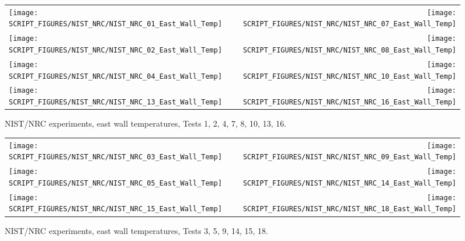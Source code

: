 \begin{figure}[p]
\begin{tabular*}{\textwidth}{l@{\extracolsep{\fill}}r}
\texttt{[image: SCRIPT\_FIGURES/NIST\_NRC/NIST\_NRC\_01\_East\_Wall\_Temp]} &
\texttt{[image: SCRIPT\_FIGURES/NIST\_NRC/NIST\_NRC\_07\_East\_Wall\_Temp]} \\
\texttt{[image: SCRIPT\_FIGURES/NIST\_NRC/NIST\_NRC\_02\_East\_Wall\_Temp]} &
\texttt{[image: SCRIPT\_FIGURES/NIST\_NRC/NIST\_NRC\_08\_East\_Wall\_Temp]} \\
\texttt{[image: SCRIPT\_FIGURES/NIST\_NRC/NIST\_NRC\_04\_East\_Wall\_Temp]} &
\texttt{[image: SCRIPT\_FIGURES/NIST\_NRC/NIST\_NRC\_10\_East\_Wall\_Temp]} \\
\texttt{[image: SCRIPT\_FIGURES/NIST\_NRC/NIST\_NRC\_13\_East\_Wall\_Temp]} &
\texttt{[image: SCRIPT\_FIGURES/NIST\_NRC/NIST\_NRC\_16\_East\_Wall\_Temp]}
\end{tabular*}
\caption{NIST/NRC experiments, east wall temperatures, Tests 1, 2, 4, 7, 8, 10, 13, 16.}
\label{NIST_NRC_East_Wall_Temp_Closed}
\end{figure}

\begin{figure}[p]
\begin{tabular*}{\textwidth}{l@{\extracolsep{\fill}}r}
\texttt{[image: SCRIPT\_FIGURES/NIST\_NRC/NIST\_NRC\_03\_East\_Wall\_Temp]} &
\texttt{[image: SCRIPT\_FIGURES/NIST\_NRC/NIST\_NRC\_09\_East\_Wall\_Temp]} \\
\texttt{[image: SCRIPT\_FIGURES/NIST\_NRC/NIST\_NRC\_05\_East\_Wall\_Temp]} &
\texttt{[image: SCRIPT\_FIGURES/NIST\_NRC/NIST\_NRC\_14\_East\_Wall\_Temp]} \\
\texttt{[image: SCRIPT\_FIGURES/NIST\_NRC/NIST\_NRC\_15\_East\_Wall\_Temp]} &
\texttt{[image: SCRIPT\_FIGURES/NIST\_NRC/NIST\_NRC\_18\_East\_Wall\_Temp]}
\end{tabular*}
\caption{NIST/NRC experiments, east wall temperatures, Tests 3, 5, 9, 14, 15, 18.}
\label{NIST_NRC_East_Wall_Temp_Open}
\end{figure}

